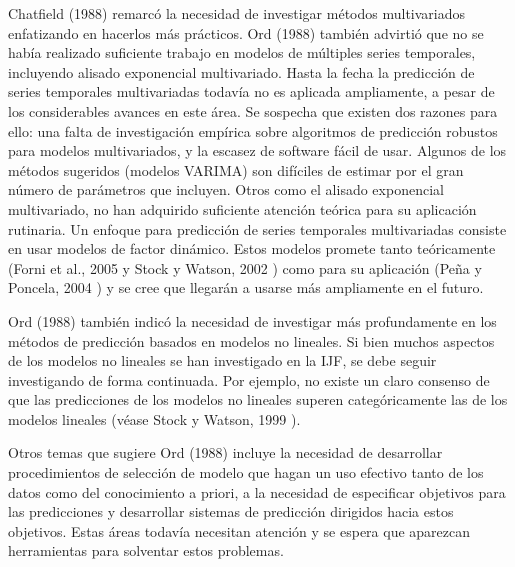 \documentclass{llncs}
\begin{document}
Chatfield (1988) \cite{Chatfield198819} remarcó la necesidad de investigar métodos multivariados enfatizando en hacerlos más prácticos. Ord (1988) \cite{Ord1988389} también advirtió que no se había realizado suficiente trabajo en modelos de múltiples series temporales, incluyendo alisado exponencial multivariado. Hasta la fecha la predicción de series temporales multivariadas todavía no es aplicada ampliamente, a pesar  de los considerables avances en este área. Se sospecha que existen dos razones para ello: una falta de investigación empírica sobre algoritmos de predicción robustos para modelos multivariados, y la escasez de software fácil de usar. Algunos de los métodos sugeridos (modelos VARIMA) son difíciles de estimar por el gran número de parámetros que incluyen. Otros como el alisado exponencial multivariado, no han adquirido suficiente atención teórica para su aplicación rutinaria. Un enfoque para predicción de series temporales multivariadas consiste en usar modelos de factor dinámico. Estos modelos promete tanto teóricamente (Forni et al., 2005 \cite{Forni2005830} y Stock y Watson, 2002 \cite{Stock20021167}) como para su aplicación (Peña y Poncela, 2004 \cite{Pena2004291}) y se cree que llegarán a usarse más ampliamente en el futuro.

Ord (1988) \cite{Ord1988389} también indicó la necesidad de investigar más profundamente en los métodos de predicción basados en modelos no lineales. Si bien muchos aspectos de los modelos no lineales se han investigado en la IJF, se debe seguir investigando de forma continuada. Por ejemplo, no existe un claro consenso de que las predicciones de los modelos no lineales superen categóricamente las de los modelos lineales (véase Stock y Watson, 1999 \cite{Stock19991}). 

Otros temas que sugiere Ord (1988) \cite{Ord1988389} incluye la necesidad de desarrollar procedimientos de selección de modelo que hagan un uso efectivo tanto de los datos como del conocimiento a priori, a la necesidad de especificar objetivos para las predicciones y desarrollar sistemas de predicción dirigidos hacia estos objetivos. Estas áreas todavía necesitan atención y se espera que aparezcan herramientas para solventar estos problemas.
\end{document}
